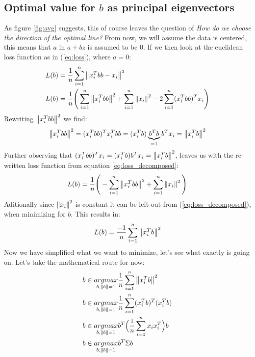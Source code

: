 \subsection{Optimal value for $b$ as principal eigenvectors}
As figure \ref{fig:avg} suggests, this of course leaves 
the question of \textit{How do we choose the direction of the optimal line?}
From now, we will assume the data is centered, this means that
$a$ in $a+bz$ is assumed to be $0$. If we then look at the 
euclidean loss function as in (\ref{eq:loss}), 
where $a=0$:
\begin{equation}
	\begin{split}
	L(b) &= \frac{1}{n}
		\sum_{i=1}^{n}\left\lVert x_i^Tbb - x_i\right\rVert^2 \\
	L(b) &= \frac{1}{n}\Bigg(
		\sum_{i=1}^{n}\left\lVert x_i^Tbb\right\rVert^2 +
		\sum_{i=1}^{n} \left\lVert x_i\right\rVert^2 - 
		2\sum_{i=1}^{n} (x_i^Tbb)^Tx_i \Bigg)\\
	\end{split}		
	\label{eq:loss_decomposed}		
\end{equation}
Rewriting $\left\lVert x_i^Tbb\right\rVert^2$ we find:
\begin{equation}
\left\lVert x_i^Tbb\right\rVert^2 = (x_i^Tbb)^Tx_i^Tbb = (x_i^Tb)\underbrace{b^Tb}_{=1}b^Tx_i = \left\lVert x_i^Tb\right\rVert^2
\end{equation}
Further observing that $(x_i^Tbb)^Tx_i = (x_i^Tb)b^Tx_i = \left\lVert x_i^Tb\right\rVert^2$,
leaves us with the re-written loss function from equation
\ref{eq:loss_decomposed}:
\begin{equation}
\begin{split}
L(b) = \frac{1}{n}\Bigg(
	-\sum_{i=1}^{n}\left\lVert x_i^Tbb\right\rVert^2 +
	\sum_{i=1}^{n} \left\lVert x_i\right\rVert^2\Bigg)\\
\end{split}	
\end{equation}
Aditionally since $\left\lVert x_i\right\rVert^2$ is constant it can be 
left out from (\ref{eq:loss_decomposed}), when minimizing
for $b$. This results in:
\begin{equation}
\begin{split}
	L(b) = \frac{-1}{n}\sum_{i=1}^{n} \left\lVert x_i^Tb\right\rVert^2 \\
\end{split}			
\end{equation}
Now we have simplified what we want to minimize, let's 
see what exactly is going on. Let's take the mathematical
route for now:
			\begin{equation}
			\label{eq:sample_var}
				\begin{split}
					b&\in\underset{b,\left\lVert b\right\rVert=1}{argmax}\frac{1}{n}\sum_{i=1}^{n} \left\lVert x_i^Tb\right\rVert^2 \\
					b&\in\underset{b,\left\lVert b\right\rVert=1}{argmax}\frac{1}{n}\sum_{i=1}^{n} (x_i^Tb)^T(x_i^Tb) \\
					b&\in\underset{b,\left\lVert b\right\rVert=1}{argmax } b^T\Big(\frac{1}{n}\sum_{i=1}^{n} x_ix_i^T\Big)b \\					
					b&\in\underset{b,\left\lVert b\right\rVert=1}{argmax } b^T \Sigma b \\
				\end{split}			
			\end{equation}

